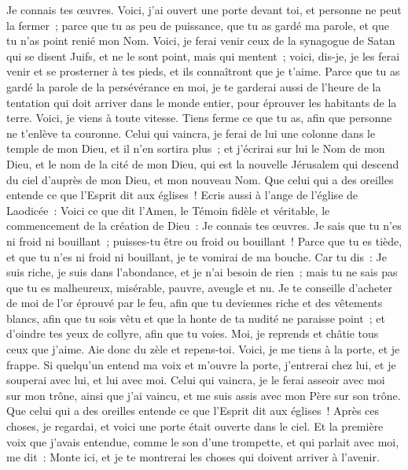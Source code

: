 \begin{multicols}{2}
Je connais tes œuvres. Voici, j'ai ouvert une porte devant toi, et personne ne peut la fermer~; parce que tu as peu de puissance, que tu as gardé ma parole, et que tu n'as point renié mon Nom.
Voici, je ferai venir ceux de la synagogue de Satan qui se disent Juifs, et ne le sont point, mais qui mentent~; voici, dis-je, je les ferai venir et se prosterner à tes pieds, et ils connaîtront que je t'aime.
Parce que tu as gardé la parole de la persévérance en moi, je te garderai aussi de l'heure de la tentation qui doit arriver dans le monde entier, pour éprouver les habitants de la terre.
Voici, je viens à toute vitesse. Tiens ferme ce que tu as, afin que personne ne t'enlève ta couronne.
Celui qui vaincra, je ferai de lui une colonne dans le temple de mon Dieu, et il n'en sortira plus~; et j'écrirai sur lui le Nom de mon Dieu, et le nom de la cité de mon Dieu, qui est la nouvelle Jérusalem qui descend du ciel d'auprès de mon Dieu, et mon nouveau Nom.
Que celui qui a des oreilles entende ce que l'Esprit dit aux églises~!
Ecris aussi à l'ange de l'église de Laodicée~: Voici ce que dit l'Amen, le Témoin fidèle et véritable, le commencement de la création de Dieu~:
Je connais tes œuvres. Je sais que tu n'es ni froid ni bouillant~; puisses-tu être ou froid ou bouillant~!
Parce que tu es tiède, et que tu n'es ni froid ni bouillant, je te vomirai de ma bouche.
Car tu dis~: Je suis riche, je suis dans l'abondance, et je n'ai besoin de rien~; mais tu ne sais pas que tu es malheureux, misérable, pauvre, aveugle et nu.
Je te conseille d'acheter de moi de l'or éprouvé par le feu, afin que tu deviennes riche et des vêtements blancs, afin que tu sois vêtu et que la honte de ta nudité ne paraisse point~; et d'oindre tes yeux de collyre, afin que tu voies.
Moi, je reprends et châtie tous ceux que j'aime. Aie donc du zèle et repens-toi.
Voici, je me tiens à la porte, et je frappe. Si quelqu'un entend ma voix et m'ouvre la porte, j'entrerai chez lui, et je souperai avec lui, et lui avec moi.
Celui qui vaincra, je le ferai asseoir avec moi sur mon trône, ainsi que j'ai vaincu, et me suis assis avec mon Père sur son trône.
Que celui qui a des oreilles entende ce que l'Esprit dit aux églises~!
\VerseOne{}Après ces choses, je regardai, et voici une porte était ouverte dans le ciel. Et la première voix que j'avais entendue, comme le son d'une trompette, et qui parlait avec moi, me dit~: Monte ici, et je te montrerai les choses qui doivent arriver à l'avenir.

\end{multicols}
